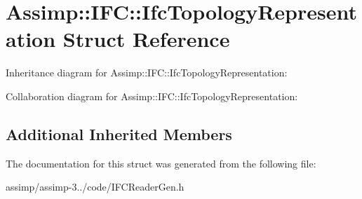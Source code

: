 \hypertarget{struct_assimp_1_1_i_f_c_1_1_ifc_topology_representation}{\section{Assimp\+:\+:I\+F\+C\+:\+:Ifc\+Topology\+Representation Struct Reference}
\label{struct_assimp_1_1_i_f_c_1_1_ifc_topology_representation}
}


Inheritance diagram for Assimp\+:\+:I\+F\+C\+:\+:Ifc\+Topology\+Representation\+:


Collaboration diagram for Assimp\+:\+:I\+F\+C\+:\+:Ifc\+Topology\+Representation\+:
\subsection*{Additional Inherited Members}


The documentation for this struct was generated from the following file\+:\begin{DoxyCompactItemize}
\item 
assimp/assimp-\/3../code/I\+F\+C\+Reader\+Gen.\+h\end{DoxyCompactItemize}

